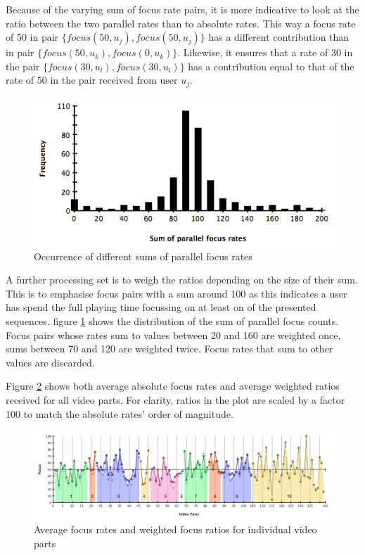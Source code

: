 Because of the varying sum of focus rate pairs, it is more indicative to look at the ratio between the two parallel rates than to absolute rates. This way a focus rate of 50 in pair $\{focus(50,u_j), focus(50,u_j)\}$ has a different contribution than in pair $\{focus(50,u_k), focus(0,u_k)\}$. Likewise, it ensures that a rate of 30 in the pair $\{focus(30,u_l), focus(30,u_l)\}$ has a contribution equal to that of the rate of 50 in the pair received from user $u_j$. 

\begin{figure}[htbp]
  \centering
    \includegraphics[width = .6\textwidth]{img/histogram_ratingsSum}
  \caption{Occurrence of different sums of parallel focus rates}
  \label{fig:histogram_ratingsSum}
\end{figure}

A further processing set is to weigh the ratios depending on the size of their sum. This is to emphasise focus pairs with a sum around 100 as this indicates a user has spend the full playing time focussing on at least on of the presented sequences. figure \ref{fig:histogram_ratingsSum} shows the distribution of the sum of parallel focus counts. Focus pairs whose rates sum to values between 20 and 160 are weighted once, sums between 70 and 120 are weighted twice. Focus rates that sum to other values are discarded.

Figure \ref{fig:videoparts_focus} shows both average absolute focus rates and average weighted ratios received for all video parts. For clarity, ratios in the plot are scaled by a factor 100 to match the absolute rates' order of magnitude.

\begin{figure}[htbp]
  \centering
    \includegraphics[width=\textwidth]{img/videoparts_focus}
  \caption{Average focus rates and weighted focus ratios for individual video parts}
  \label{fig:videoparts_focus}
\end{figure}

